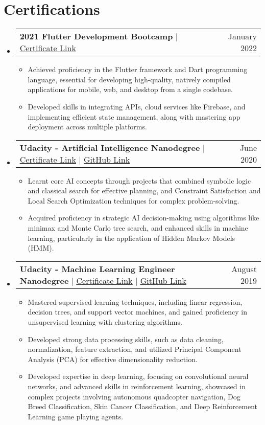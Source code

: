 \documentclass[letterpaper,11pt]{article}
\makeatletter
\newcommand{\resumeItem}[1]{
  \item\small{
    {#1 \vspace{-2pt}}
  }
}
\newcommand{\resumeProjectHeading}[2]{
    \item
    \begin{tabular*}{0.97\textwidth}{l@{\extracolsep{\fill}}r}
      \small#1 & #2 \\
    \end{tabular*}\vspace{-7pt}
}
\newcommand{\resumeSubHeadingListStart}{\begin{itemize}[leftmargin=0.15in, label={}]}
\newcommand{\resumeSubHeadingListEnd}{\end{itemize}}
\newcommand{\resumeItemListStart}{\begin{itemize}}
\newcommand{\resumeItemListEnd}{\end{itemize}\vspace{-5pt}}
\makeatother
\begin{document}
\section{Certifications}
    \resumeSubHeadingListStart
        \resumeProjectHeading
          {\textbf{2021 Flutter Development Bootcamp} $|$ \href{https://www.udemy.com/certificate/UC-5f383487-e6d6-4b9a-a33c-cd0f8b353f5f/}{\underline{Certificate Link}}}{January 2022}
          \resumeItemListStart
            \resumeItem{Achieved proficiency in the Flutter framework and Dart programming language, essential for developing high-quality, natively compiled applications for mobile, web, and desktop from a single codebase.}
            \resumeItem{Developed skills in integrating APIs, cloud services like Firebase, and implementing efficient state management, along with mastering app deployment across multiple platforms.}
          \resumeItemListEnd

        \resumeProjectHeading
          {\textbf{Udacity - Artificial Intelligence Nanodegree} $|$ \href{https://graduation.udacity.com/confirm/CTCD9YJQ}{\underline{Certificate Link}} $|$ \href{https://github.com/1998apoorvmalik/udacity-artificial-intelligence-nanodegree}{\underline{GitHub Link}}}{June 2020}
          \resumeItemListStart
            \resumeItem{Learnt core AI concepts through projects that combined symbolic logic and classical search for effective planning, and Constraint Satisfaction and Local Search Optimization techniques for complex problem-solving.}
            \resumeItem{Acquired proficiency in strategic AI decision-making using algorithms like minimax and Monte Carlo tree search, and enhanced skills in machine learning, particularly in the application of Hidden Markov Models (HMM).}
          \resumeItemListEnd

        \resumeProjectHeading
          {\textbf{Udacity - Machine Learning Engineer Nanodegree} $|$ \href{https://graduation.udacity.com/confirm/6S23AEJ5}{\underline{Certificate Link}} $|$ \href{https://github.com/1998apoorvmalik/udacity-machine-learning-engineer-nanodegree}{\underline{GitHub Link}}}{August 2019}
          \resumeItemListStart
            \resumeItem{Mastered supervised learning techniques, including linear regression, decision trees, and support vector machines, and gained proficiency in unsupervised learning with clustering algorithms.}
            \resumeItem{Developed strong data processing skills, such as data cleaning, normalization, feature extraction, and utilized Principal Component Analysis (PCA) for effective dimensionality reduction.}
            \resumeItem{ Developed expertise in deep learning, focusing on convolutional neural networks, and advanced skills in reinforcement learning, showcased in complex projects involving autonomous quadcopter navigation, Dog Breed Classification, Skin Cancer Classification, and Deep Reinforcement Learning game playing agents.}
          \resumeItemListEnd
    \resumeSubHeadingListEnd
    
\end{document}
